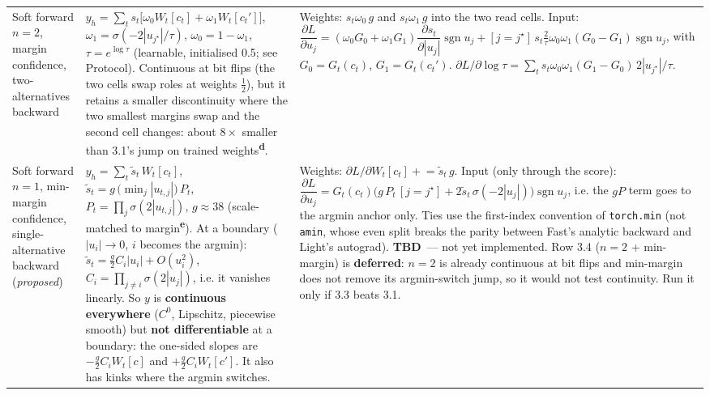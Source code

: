 \documentclass[10pt]{article}
\newcommand{\tbd}[1]{\textcolor{red!70!black}{\textbf{TBD}~--- #1}}
\newcommand{\code}[1]{{\renewcommand{\_}{\textunderscore\allowbreak}\texttt{#1}}}
\newcommand{\sgn}{\operatorname{sgn}}
\newcommand{\note}[1]{\textsuperscript{\textbf{#1}}}
\begin{document}
\begin{longtable}{>{\raggedright\arraybackslash}p{2.9cm} >{\raggedright\arraybackslash}p{8.8cm} >{\raggedright\arraybackslash}p{12.0cm}}
3.2 Soft forward $n{=}2$, margin confidence, two-alternatives backward &
$y_h=\sum_t s_t\big[\omega_0W_t[c_t]+\omega_1W_t[c_t']\big]$, \newline
$\omega_1=\sigma(-2|u_{j^\star}|/\tau)$, $\omega_0=1-\omega_1$, $\tau=e^{\log\tau}$ (learnable, initialised 0.5; see Protocol). \newline
Continuous at bit flips (the two cells swap roles at weights $\tfrac12$), but it retains a smaller discontinuity where the two smallest margins
swap and the second cell changes: about $8\times$ smaller than 3.1's jump on trained weights\note{d}. &
Weights: $s_t\omega_0\,g$ and $s_t\omega_1\,g$ into the two read cells. \newline
Input: $\dfrac{\partial L}{\partial u_j}=(\omega_0G_0+\omega_1G_1)\dfrac{\partial s_t}{\partial|u_j|}\sgn u_j+[j=j^\star]\,s_t\tfrac{2}{\tau}\omega_0\omega_1(G_0-G_1)\sgn u_j$,
with $G_0=G_t(c_t)$, $G_1=G_t(c_t')$. \newline
$\partial L/\partial\log\tau=\sum_t s_t\omega_0\omega_1(G_1-G_0)\,2|u_{j^\star}|/\tau$. \\[3pt]
3.3 Soft forward $n{=}1$, min-margin confidence, single-alternative backward (\emph{proposed}) &
$y_h=\sum_t \tilde s_t\,W_t[c_t]$, $\tilde s_t=g\,\big(\min_j|u_{t,j}|\big)\,P_t$, $P_t=\prod_j\sigma(2|u_{t,j}|)$, $g\approx38$ (scale-matched to margin\note{e}). \newline
At a boundary ($|u_i|\to0$, $i$ becomes the argmin): $\tilde s_t=\tfrac g2 C_i|u_i|+O(u_i^2)$, $C_i=\prod_{j\neq i}\sigma(2|u_j|)$, i.e. it vanishes linearly.
So $y$ is \textbf{continuous everywhere} ($C^0$, Lipschitz, piecewise smooth) but \textbf{not differentiable} at a boundary:
the one-sided slopes are $-\tfrac g2C_iW_t[c]$ and $+\tfrac g2C_iW_t[c']$. It also has kinks where the argmin switches. &
Weights: $\partial L/\partial W_t[c_t]\mathrel{+}=\tilde s_t\,g$. \newline
Input (only through the score): $\dfrac{\partial L}{\partial u_j}=G_t(c_t)\big(g\,P_t\,[j=j^\star]+2\tilde s_t\,\sigma(-2|u_j|)\big)\sgn u_j$, i.e. the $gP$ term goes to the argmin anchor only.
Ties use the first-index convention of \code{torch.min} (not \code{amin}, whose even split breaks the parity between Fast's analytic backward and Light's autograd). \newline
\tbd{not yet implemented.} Row 3.4 ($n=2$ + min-margin) is \textbf{deferred}: $n=2$ is already continuous at bit flips and min-margin does not remove its
argmin-switch jump, so it would not test continuity. Run it only if 3.3 beats 3.1. \\
\end{longtable}
\end{document}
